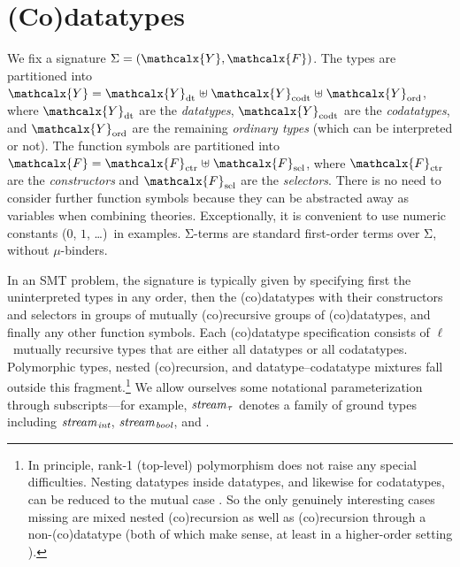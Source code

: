 \documentclass[smallcondensed,draft]{svjour3}
\newcommand\Sig{\mathrm{\Sigma}}
\newcommand\ty[1]{\textit{#1}}
\newcommand\Types{\mathcalx{Y}}
\newcommand\Funcs{\mathcalx{F}}
\newcommand\Data{\Types_{\mathrm{dt}}}
\newcommand\Codata{\Types_{\mathrm{codt}}}
\newcommand\Nondata{\Types_{\mathrm{ord}}}
\newcommand\Ctr{\Funcs_{\smash{\mathrm{ctr}}}}
\newcommand\Sel{\Funcs_{\smash{\mathrm{sel}}}}
\newcommand\vthinspace{\kern+0.083333em}
\begin{document}
\section{%
(Co)datatypes}
\label{sec:co-datatypes}


We fix a signature $\Sig = (\Types, \Funcs)$. The types are partitioned into
$\Types = \Data \mathrel{\uplus} \Codata \mathrel{\uplus} \Nondata$, where $\Data$ are the
\emph{datatypes}, $\Codata$ are the \emph{codatatypes}, and $\Nondata$ are the remaining
\emph{ordinary types} (which can be interpreted or not). The function symbols are
partitioned into $\Funcs = \Ctr \mathrel{\uplus} \Sel$, where $\Ctr$ are the
\emph{constructors} and $\Sel$ are the \emph{selectors}. There is no need to
consider further function symbols because they can be abstracted away as
variables when combining theories.
Exceptionally, it is convenient to use numeric constants ($0$, $1$, \ldots)\ in
examples.
$\Sig$-terms are standard first-order terms
over $\Sig$,
without $\mu$-binders.

In an SMT problem, the signature is typically given by specifying first the
uninterpreted %
types in any order, then the (co)datatypes with their constructors
and selectors in groups of mutually (co)recursive groups of (co)datatypes, and
finally any other function symbols.
%
Each (co)datatype specification consists of $\ell$~mutually recursive types that are
either all datatypes or all codatatypes. Polymorphic types, nested
(co)recursion, and datatype--codatatype mixtures
fall outside this fragment.\footnote{In principle, rank-1 (top-level) polymorphism \cite{blanchette-paskevich-2013}
does not raise any special difficulties. Nesting datatypes inside datatypes,
and likewise for codatatypes, can be reduced to the mutual case
\cite{gunter-1993-not}. So the only genuinely interesting cases missing are
mixed nested (co)recursion as well as
(co)recursion through a non-(co)datatype (both of which make sense,
at least in a higher-order setting \cite{blanchette-et-al-2014-impl}).}
We allow ourselves some notational parameterization
through subscripts---for example, $\ty{stream}_{\vthinspace\tau}$ denotes a
family of ground types including
$\ty{stream}_{\vthinspace\ty{int}}$, $\ty{stream}_{\vthinspace\ty{bool}}$,
and \smash{$\ty{stream}_{\vthinspace\ty{stream}_{\vthinspace\ty{real}}}$}.
\end{document}
